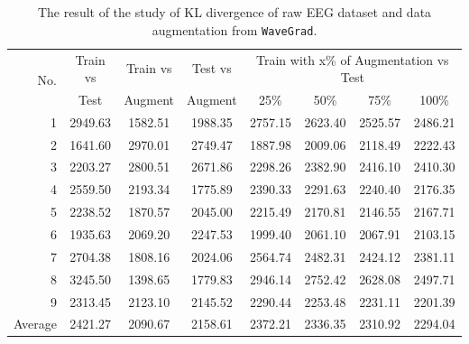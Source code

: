 \begin{table}[ht!]
    \centering
    \caption[The result of KL divergence]{The result of the study of KL divergence of raw EEG dataset and data augmentation from \texttt{WaveGrad}.}
    \label{tab:KL-wavegrad}
        {\small\begin{tabular}{rccccccc}
        \hline
        \multirow{2}{*}{No.} & Train vs & Train vs & Test vs & \multicolumn{4}{c}{Train with x\% of Augmentation vs Test} \\ 
        \cline{5-8} 
                             & Test     & Augment  & Augment & 25\%          & 50\%         & 75\%         & 100\%        \\
        \hline
        1                    & 2949.63  & 1582.51  & 1988.35 & 2757.15       & 2623.40      & 2525.57      & 2486.21      \\
        2                    & 1641.60  & 2970.01  & 2749.47 & 1887.98       & 2009.06      & 2118.49      & 2222.43      \\
        3                    & 2203.27  & 2800.51  & 2671.86 & 2298.26       & 2382.90      & 2416.10      & 2410.30      \\
        4                    & 2559.50  & 2193.34  & 1775.89 & 2390.33       & 2291.63      & 2240.40      & 2176.35      \\
        5                    & 2238.52  & 1870.57  & 2045.00 & 2215.49       & 2170.81      & 2146.55      & 2167.71      \\
        6                    & 1935.63  & 2069.20  & 2247.53 & 1999.40       & 2061.10      & 2067.91      & 2103.15      \\
        7                    & 2704.38  & 1808.16  & 2024.06 & 2564.74       & 2482.31      & 2424.12      & 2381.11      \\
        8                    & 3245.50  & 1398.65  & 1779.83 & 2946.14       & 2752.42      & 2628.08      & 2497.71      \\
        9                    & 2313.45  & 2123.10  & 2145.52 & 2290.44       & 2253.48      & 2231.11      & 2201.39      \\
        \hline
        Average              & 2421.27  & 2090.67  & 2158.61 & 2372.21       & 2336.35      & 2310.92      & 2294.04      \\
        \hline
        \end{tabular}}
\end{table}


